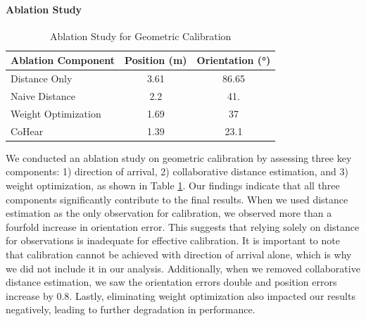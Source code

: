 \paragraph{Ablation Study}
\begin{table}
    \centering
    \caption{Ablation Study for Geometric Calibration}
     \vspace{-1em}
    \begin{tabular}{|l|c|c|}
        \hline
        \textbf{Ablation Component} & \textbf{Position (m)} & \textbf{Orientation (°)} \\
        \hline
        Distance Only & 3.61 & 86.65 \\
        \hline
        Naive Distance & 2.2 & 41. \\
        \hline
        Weight Optimization & 1.69 & 37 \\
        \hline
        CoHear & 1.39 & 23.1 \\
        \hline
    \end{tabular}
    \label{tab:ablation_calibration}
        \vspace{-1em}
\end{table}
We conducted an ablation study on geometric calibration by assessing three key components: 1) direction of arrival, 2) collaborative distance estimation, and 3) weight optimization, as shown in Table \ref{tab:ablation_calibration}. Our findings indicate that all three components significantly contribute to the final results. When we used distance estimation as the only observation for calibration, we observed more than a fourfold increase in orientation error. This suggests that relying solely on distance for observations is inadequate for effective calibration.
It is important to note that calibration cannot be achieved with direction of arrival alone, which is why we did not include it in our analysis. Additionally, when we removed collaborative distance estimation, we saw the orientation errors double and position errors increase by 0.8. Lastly, eliminating weight optimization also impacted our results negatively, leading to further degradation in performance.



